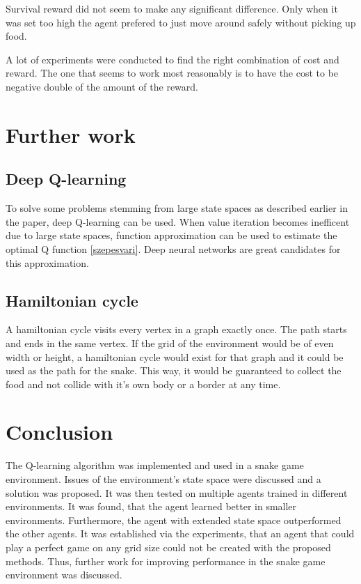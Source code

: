 \documentclass[lettersize,journal]{IEEEtran}
\begin{document}
Survival reward did not seem to make any significant difference.
Only when it was set too high the agent prefered to just move
around safely without picking up food.

A lot of experiments were conducted to find the right combination
of cost and reward. The one that seems to work most reasonably
is to have the cost to be negative double of the amount of the reward.

\section{Further work}
\subsection{Deep Q-learning}
To solve some problems stemming from large state spaces as described earlier in
the paper, deep Q-learning can be used. When value iteration becomes
inefficent due to large state spaces, function approximation can be used
to estimate the optimal Q function \ref{szepesvari}. Deep neural networks
are great candidates for this approximation.

\subsection{Hamiltonian cycle}
A hamiltonian cycle visits every vertex in a graph exactly once.
The path starts and ends in the same vertex.
If the grid of the environment would be of even width or height,
a hamiltonian cycle would exist for that graph \cite{cycle} and it could be
used as the path for the snake. This way, it would be guaranteed
to collect the food and not collide with it's own body or a border
at any time.

\section{Conclusion}
The Q-learning algorithm was implemented and used in a snake game
environment. Issues of the environment's state space were discussed
and a solution was proposed. It was then tested on multiple agents
trained in different environments. It was found, that the agent
learned better in smaller environments. Furthermore, the agent
with extended state space outperformed the other agents.
It was established via the experiments, that an agent that could play a perfect
game on any grid size could not be created with the proposed methods.
Thus, further work for improving performance in the snake game environment was discussed.
\end{document}
